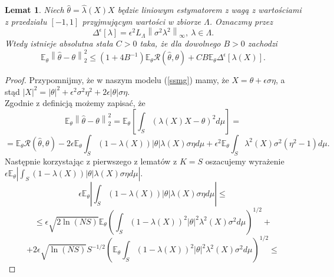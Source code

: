 \documentclass{article}
\newtheorem*{lem}{Lemat}
\newcommand{\norm}[1]{\left\lVert#1\right\rVert}
\begin{document}
\begin{lem}
Niech $\hat{\theta}=\hat{\lambda}(X)X$ będzie liniowym estymatorem z wagą z wartościami z przedziału $[-1,1]$ przyjmującym wartości w zbiorze $\Lambda$. Oznaczmy przez 
\begin{displaymath}
\Delta^{\epsilon}[\lambda]=\epsilon^2L_{\Lambda}\norm{\sigma^2\lambda^2}_{\infty},\ \lambda\in \Lambda.
\end{displaymath}
Wtedy istnieje absolutna stała $C>0$ taka, że dla dowolnego $B>0$ zachodzi
\begin{displaymath}
\mathbb{E}_{\theta}\norm{\hat{\theta}-\theta}_2^2\leq (1+4B^{-1})\mathbb{E}_{\theta}\mathcal{R}(\hat{\theta},\theta)+CB\mathbb{E}_{\theta}\Delta^{\epsilon}[\lambda (X)].
\end{displaymath}
\end{lem}
\begin{proof}
Przypomnijmy, że w naszym modelu (\ref{ssmg}) mamy, że $X=\theta+\epsilon\sigma\eta$, a stąd $|X|^2=|\theta|^2+\epsilon^2\sigma^2\eta^2+2\epsilon|\theta|\sigma\eta$.\\
Zgodnie z definicją możemy zapisać, że
\begin{displaymath}
\mathbb{E}_{\theta}\norm{\hat{\theta}-\theta}_2^2=\mathbb{E}_{\theta}\left[\int_S\left(\lambda(X)X-\theta\right)^2d\mu\right]=
\end{displaymath}
\begin{displaymath}
=\mathbb{E}_{\theta}\mathcal{R}(\hat{\theta},\theta)-2\epsilon\mathbb{E}_{\theta}\int_S(1-\lambda (X))|\theta |\lambda (X)\sigma\eta d\mu+\epsilon^2\mathbb{E}_{\theta}\int_S\lambda^2(X)\sigma^2(\eta^2-1)d\mu.
\end{displaymath}
Następnie korzystając z pierwszego z lematów z $K=S$ oszacujemy wyrażenie $\epsilon\mathbb{E}_{\theta}\left|\int_S(1-\lambda (X))|\theta |\lambda (X)\sigma\eta d\mu\right|$. 
\begin{displaymath}
\epsilon\mathbb{E}_{\theta}\left|\int_S(1-\lambda (X))|\theta |\lambda (X)\sigma\eta d\mu\right|\leq
\end{displaymath}
\begin{displaymath}
\leq \epsilon\sqrt{2\ln (NS)}\mathbb{E}_{\theta}\left(\int_S(1-\lambda(X))^2|\theta |^2\lambda^2(X)\sigma^2d\mu\right)^{1/2}+
\end{displaymath}
\begin{displaymath}
+2\epsilon\sqrt{\ln (NS)}S^{-1/2}\left(\mathbb{E}_{\theta}\int_S(1-\lambda(X))^2|\theta |^2\lambda^2(X)\sigma^2d\mu\right)^{1/2}\leq
\end{displaymath}

\end{proof}
\end{document}
